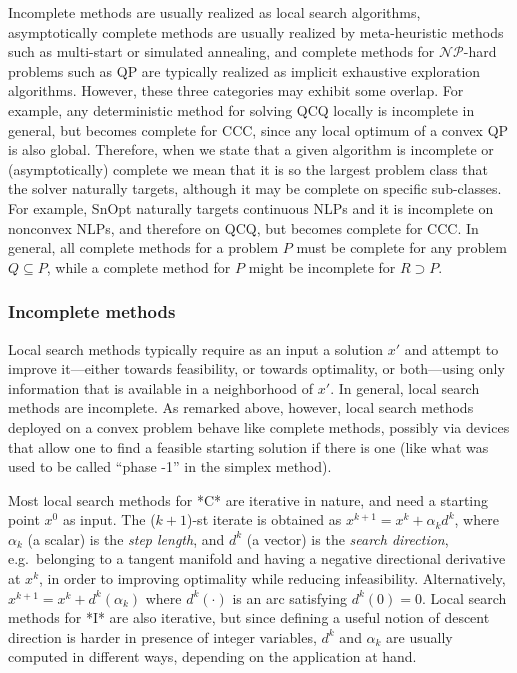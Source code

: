 Incomplete methods are usually realized as local search algorithms, asymptotically complete methods are usually realized by meta-heuristic methods such as multi-start or simulated annealing, and complete methods for $\mathcal{NP}$-hard problems such as QP are typically realized as implicit exhaustive exploration algorithms. However, these three categories may exhibit some overlap. For example, any deterministic method for solving QCQ locally is incomplete in general, but becomes complete for CCC, since any local optimum of a convex QP is also global. Therefore, when we state that a given algorithm is incomplete or (asymptotically) complete we mean that it is so the largest problem class that the solver naturally targets, although it may be complete on specific sub-classes. For example, {\sc SnOpt} naturally targets continuous NLPs and it is incomplete on nonconvex NLPs, and therefore on QCQ, but becomes complete for CCC. In general, all complete methods for a problem $P$ must be complete for any problem $Q \subseteq P$, while a complete method for $P$ might be incomplete for $R \supset P$. 


\subsubsection{Incomplete methods}\label{s:incomplete}

Local search methods typically require as an input a solution $x'$ and attempt to improve it---either towards feasibility, or towards optimality, or both---using only information that is available in a neighborhood of $x'$. In general, local search methods are incomplete. As remarked above, however, local search methods deployed on a convex problem behave like complete methods, possibly via devices that allow one to find a feasible starting solution if there is one (like what was used to be called ``phase -1'' in the simplex method).

Most local search methods for *C* are iterative in nature, and need a starting point $x^0$ as input. The ($k+1$)-st iterate is obtained as $x^{k+1} = x^k + \alpha_k d^k$, where $\alpha_k$ (a scalar) is the {\it step length}, and $d^k$ (a vector) is the {\it search direction}, e.g.~belonging to a tangent manifold and having a negative directional derivative at $x^k$, in order to improving optimality while reducing infeasibility. Alternatively, $x^{k+1} = x^k + d^k(\alpha_k)$ where $d^k(\cdot)$ is an arc satisfying $d^k(0) = 0$. Local search methods for *I* are also iterative, but since defining a useful notion of descent direction is harder in presence of integer variables, $d^k$ and $\alpha_k$ are usually computed in different ways, depending on the application at hand. 

